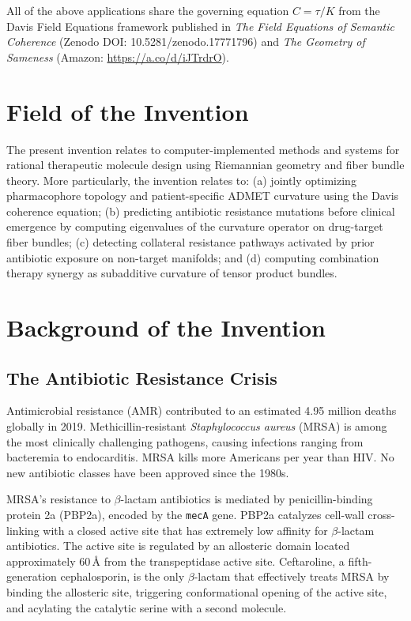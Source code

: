 \documentclass[11pt]{article}
\begin{document}
All of the above applications share the governing equation $C = \tau/K$ from the Davis Field
Equations framework published in \emph{The Field Equations of Semantic Coherence}
(Zenodo DOI: 10.5281/zenodo.17771796) and \emph{The Geometry of Sameness}
(Amazon: \url{https://a.co/d/iJTrdrO}).

\section{Field of the Invention}

The present invention relates to computer-implemented methods and systems for rational
therapeutic molecule design using Riemannian geometry and fiber bundle theory. More
particularly, the invention relates to: (a) jointly optimizing pharmacophore topology and
patient-specific ADMET curvature using the Davis coherence equation; (b) predicting
antibiotic resistance mutations before clinical emergence by computing eigenvalues of
the curvature operator on drug-target fiber bundles; (c) detecting collateral resistance
pathways activated by prior antibiotic exposure on non-target manifolds; and
(d) computing combination therapy synergy as subadditive curvature of tensor product bundles.

\section{Background of the Invention}

\subsection{The Antibiotic Resistance Crisis}

Antimicrobial resistance (AMR) contributed to an estimated 4.95 million deaths globally
in 2019. Methicillin-resistant \textit{Staphylococcus aureus} (MRSA) is among the most
clinically challenging pathogens, causing infections ranging from bacteremia to endocarditis.
MRSA kills more Americans per year than HIV. No new antibiotic classes have been approved
since the 1980s.

MRSA's resistance to $\beta$-lactam antibiotics is mediated by penicillin-binding protein 2a
(PBP2a), encoded by the \texttt{mecA} gene. PBP2a catalyzes cell-wall cross-linking with
a closed active site that has extremely low affinity for $\beta$-lactam antibiotics. The
active site is regulated by an allosteric domain located approximately 60\,\AA{} from the
transpeptidase active site. Ceftaroline, a fifth-generation cephalosporin, is the only
$\beta$-lactam that effectively treats MRSA by binding the allosteric site, triggering
conformational opening of the active site, and acylating the catalytic serine with a second
molecule.
\end{document}
